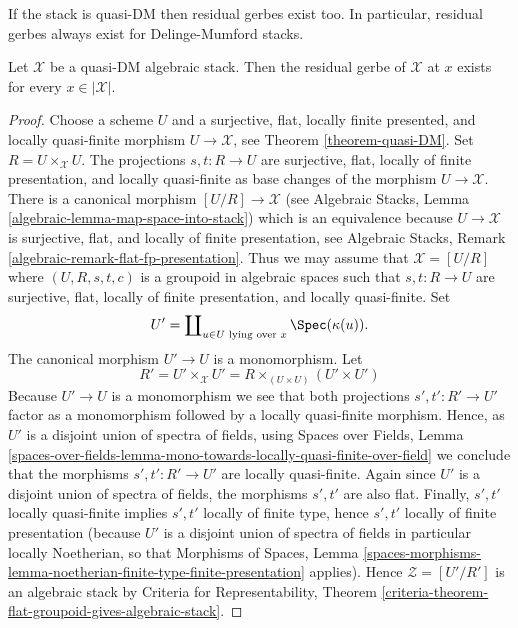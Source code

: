 \noindent
If the stack is quasi-DM then residual gerbes exist too.
In particular, residual gerbes always exist for Delinge-Mumford stacks.

\begin{lemma}
\label{lemma-every-point-residual-gerbe-quasi-DM}
Let $\mathcal{X}$ be a quasi-DM algebraic stack.
Then the residual gerbe of $\mathcal{X}$ at $x$ exists for
every $x \in |\mathcal{X}|$.
\end{lemma}

\begin{proof}
Choose a scheme $U$ and a surjective, flat, locally finite presented,
and locally quasi-finite morphism $U \to \mathcal{X}$, see
Theorem \ref{theorem-quasi-DM}.
Set $R = U \times_\mathcal{X} U$. The projections $s, t : R \to U$
are surjective, flat, locally of finite presentation, and
locally quasi-finite as base changes of the morphism $U \to \mathcal{X}$.
There is a canonical morphism $[U/R] \to \mathcal{X}$ (see
Algebraic Stacks, Lemma \ref{algebraic-lemma-map-space-into-stack})
which is an equivalence because $U \to \mathcal{X}$ is surjective, flat,
and locally of finite presentation, see
Algebraic Stacks, Remark \ref{algebraic-remark-flat-fp-presentation}.
Thus we may assume that $\mathcal{X} = [U/R]$ where
$(U, R, s, t, c)$ is a groupoid in algebraic spaces such that
$s, t : R \to U$ are surjective, flat, locally of finite presentation,
and locally quasi-finite. Set
$$
U' = \coprod\nolimits_{u \in U\text{ lying over }x} \Spec(\kappa(u)).
$$
The canonical morphism $U' \to U$ is a monomorphism. Let
$$
R' = U' \times_\mathcal{X} U' =
R \times_{(U \times U)} (U' \times U')
$$
Because $U' \to U$ is a monomorphism we see that both projections
$s', t' : R' \to U'$ factor as a monomorphism followed by a locally
quasi-finite morphism. Hence, as $U'$ is a disjoint union of spectra
of fields, using
Spaces over Fields, Lemma
\ref{spaces-over-fields-lemma-mono-towards-locally-quasi-finite-over-field}
we conclude that the morphisms $s', t' : R' \to U'$ are locally quasi-finite.
Again since $U'$ is a disjoint union of spectra of fields, the morphisms
$s', t'$ are also flat. Finally, $s', t'$ locally quasi-finite
implies $s', t'$ locally of finite type, hence $s', t'$ locally of finite
presentation (because $U'$ is a disjoint union of spectra of fields
in particular locally Noetherian, so that
Morphisms of Spaces, Lemma
\ref{spaces-morphisms-lemma-noetherian-finite-type-finite-presentation}
applies). Hence $\mathcal{Z} = [U'/R']$ is an algebraic stack by
Criteria for Representability, Theorem
\ref{criteria-theorem-flat-groupoid-gives-algebraic-stack}.

\end{proof}

